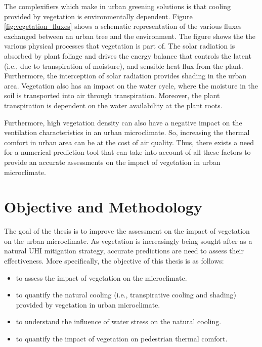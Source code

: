 The complexifiers which make in urban greening solutions is that cooling provided by vegetation is environmentally dependent. Figure \ref{fig:vegetation_fluxes} shows a schematic representation of the various fluxes exchanged between an urban tree and the environment. The figure shows the the various physical processes that vegetation is part of. The solar radiation is absorbed by plant foliage and drives the energy balance that controls the latent (i.e., due to transpiration of moisture), and sensible heat flux from the plant. Furthermore, the interception of solar radiation provides shading in the urban area. Vegetation also has an impact on the water cycle, where the moisture in the soil is transported into air through transpiration. Moreover, the plant transpiration is dependent on the water availability at the plant roots. %


Furthermore, high vegetation density can also have a negative impact on the ventilation characteristics in an urban microclimate. So, increasing the thermal comfort in urban area can be at the cost of air quality. Thus, there exists a need for a numerical prediction tool that can take into account of all these factors to provide an accurate assessments on the impact of vegetation in urban microclimate. 

\section{Objective and Methodology}

The goal of the thesis is to improve the assessment on the impact of vegetation on the urban microclimate. As vegetation is increasingly being sought after as a natural UHI mitigation strategy, accurate predictions are need to assess their effectiveness. More specifically, the objective of this thesis is as follows:
\begin{itemize}
	\item to assess the impact of vegetation on the microclimate.
	
	\item to quantify the natural cooling (i.e., transpirative cooling and shading) provided by vegetation in urban microclimate.
	
	\item to understand the influence of water stress on the natural cooling.
	
	\item to quantify the impact of vegetation on pedestrian thermal comfort. 
\end{itemize}

